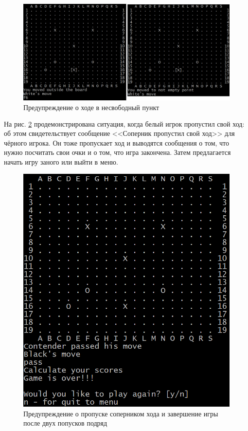 \begin{figure}[H]
	\begin{center}
		\includegraphics[scale=0.6]{pics/GoCUI/NotEmpty.png}
	    \caption{Предупреждение о ходе в несвободный пункт} 
		\label{pic:CUI_NotEmpty}
	\end{center}
\end{figure}

На рис. \ref{pic:CUI_Pass} продемонстрирована ситуация, когда белый игрок пропустил свой ход: об этом свидетельствует сообщение <<Соперник пропустил свой ход>> для чёрного игрока. Он тоже пропускает ход и выводятся сообщения о том, что нужно посчитать свои очки и о том, что игра закончена. Затем предлагается начать игру заного или выйти в меню.

\begin{figure}[H]
	\begin{center}
		\includegraphics[scale=0.6]{pics/GoCUI/Pass.png}
	    \caption{Предупреждение о пропуске соперником хода и завершение игры после двух попусков подряд} 
		\label{pic:CUI_Pass}
	\end{center}
\end{figure}

